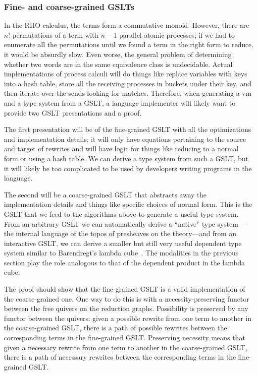 \documentclass{article}
\begin{document}
\subsubsection{Fine- and coarse-grained GSLTs}
In the RHO calculus, the terms form a commutative monoid.  However, there are $n!$ permutations of a term with $n-1$ parallel atomic processes; if we had to enumerate all the permutations until we found a term in the right form to reduce, it would be absurdly slow.  Even worse, the general problem of determining whether two words are in the same equivalence class is undecidable.  Actual implementations of process calculi will do things like replace variables with keys into a hash table, store all the receiving processes in buckets under their key, and then iterate over the sends looking for matches.  Therefore, when generating a vm and a type system from a GSLT, a language implementer will likely want to provide two GSLT presentations and a proof.

The first presentation will be of the fine-grained GSLT with all the optimizations and implementation details; it will only have equations pertaining to the source and target of rewrites and will have logic for things like reducing to a normal form or using a hash table.  We can derive a type system from such a GSLT, but it will likely be too complicated to be used by developers writing programs in the language.

The second will be a coarse-grained GSLT that abstracts away the implementation details and things like specific choices of normal form.  This is the GSLT that we feed to the algorithms above to generate a useful type system.  From an arbitrary GSLT we can automatically derive a ``native'' type system~\cite{WilliamsStay2021}---the internal language of the topos of presheaves on the theory---and from an interactive GSLT, we can derive a smaller but still very useful dependent type system similar to Barendregt's lambda cube~\cite{HypercubePaper}.  The modalities in the previous section play the role analogous to that of the dependent product in the lambda cube.

The proof should show that the fine-grained GSLT is a valid implementation of the coarse-grained one.  One way to do this is with a necessity-preserving functor between the free quivers on the reduction graphs.  Possibility is preserved by any functor between the quivers: given a possible rewrite from one term to another in the coarse-grained GSLT, there is a path of possible rewrites between the corresponding terms in the fine-grained GSLT.  Preserving necessity means that given a necessary rewrite from one term to another in the coarse-grained GSLT, there is a path of necessary rewrites between the corresponding terms in the fine-grained GSLT.
\end{document}
